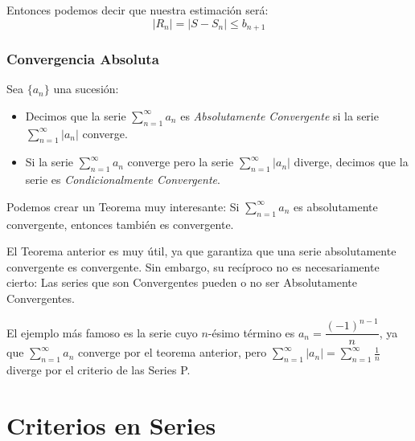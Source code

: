 \documentclass[12pt]{report}							    %
\begin{document}
        Entonces podemos decir que nuestra estimación será:
        \begin{equation}
            |R_n| = |S - S_n| \leq b_{n+1}
        \end{equation}

    \subsection{Convergencia Absoluta}

        Sea $\{a_n\}$ una sucesión:

        \begin{itemize}
            \item Decimos que la serie $\sum_{n=1}^{\infty} a_n$ es \emph{Absolutamente Convergente} si la serie $\sum_{n=1}^{\infty} |a_n|$ converge.

            \item Si la serie $\sum_{n=1}^{\infty} a_n$ converge pero la serie $\sum_{n=1}^{\infty} |a_n|$ diverge, decimos que la serie es \emph{Condicionalmente Convergente}.
        \end{itemize}

        Podemos crear un Teorema muy interesante:
        Si $\sum_{n=1}^{\infty} a_n$ es absolutamente convergente, entonces también es convergente.

        El Teorema anterior es muy útil, ya que garantiza que una serie absolutamente convergente es convergente.
        Sin embargo, su recíproco no es necesariamente cierto: Las series que son Convergentes pueden o no ser Absolutamente Convergentes. 

        El ejemplo más famoso es la serie cuyo $n$-ésimo término es $a_n=\dfrac{(-1)^{n-1}}{n}$, ya que $\sum_{n=1}^{\infty}a_n$ converge por el teorema anterior, pero $\sum_{n=1}^{\infty} |a_n| = \sum_{n=1}^{\infty} \frac{1}{n}$ diverge por el criterio de las Series P.







\clearpage
\chapter{Criterios en Series}
\end{document}
